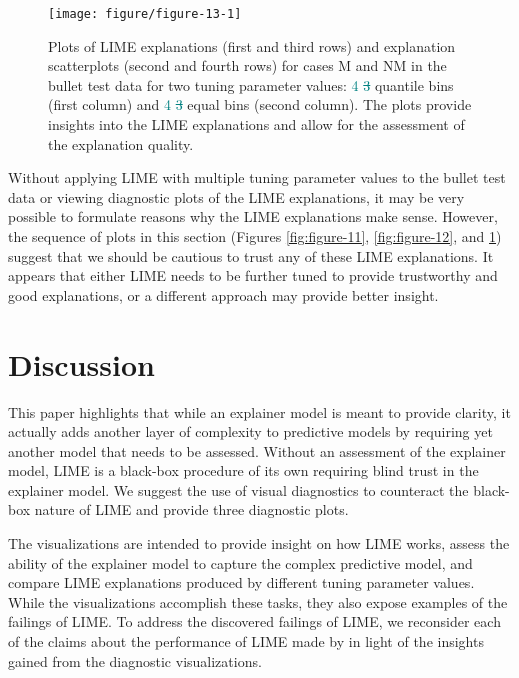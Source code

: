 \documentclass[AMS,STIX2COL]{WileyNJD-v2}\usepackage[]{graphicx}\usepackage[]{color}
\newenvironment{knitrout}{}{} %
\newcommand{\kge}[1]{\textcolor{teal}{#1}}
\begin{document}
\begin{figure}[!thp]
\begin{knitrout}
\color{fgcolor}

{\centering \texttt{[image: figure/figure-13-1]} 

}



\end{knitrout}
\caption{Plots of LIME explanations (first and third rows) and explanation scatterplots (second and fourth rows) for  cases M and NM in the bullet test data for two tuning parameter values: \kge{4 \sout{3}} quantile bins (first column) and \kge{4 \sout{3}} equal bins (second column).  The plots provide insights into the LIME explanations and allow for the assessment of the explanation quality.}
\label{fig:figure-13}
\end{figure}

Without applying LIME with multiple tuning parameter values to the bullet test data or viewing diagnostic plots of the LIME explanations, it may be very possible to formulate reasons why the LIME explanations make sense. However, the sequence of plots in this section (Figures \ref{fig:figure-11}, \ref{fig:figure-12}, and \ref{fig:figure-13}) suggest that we should be cautious to trust any of these LIME explanations. It appears that either LIME needs to be further tuned to provide trustworthy and good explanations, or a different approach may provide better insight. 

\section{Discussion} \label{discussion}

This paper highlights that while an explainer model is meant to provide clarity, it actually adds another layer of complexity to predictive models by requiring yet another model that needs to be assessed. Without an assessment of the explainer model, LIME is a black-box procedure of its own requiring blind trust in the explainer model. We suggest the use of visual diagnostics to counteract the black-box nature of LIME and provide three diagnostic plots.

The visualizations are intended to provide insight on how LIME works, assess the ability of the explainer model to capture the complex predictive model, and compare LIME explanations produced by different tuning parameter values. While the visualizations accomplish these tasks, they also expose examples of the failings of LIME. To address the discovered failings of LIME, we reconsider each of the claims about the performance of LIME made by \citet{ribeiro:2016} in light of the insights gained from the diagnostic visualizations.
\end{document}
